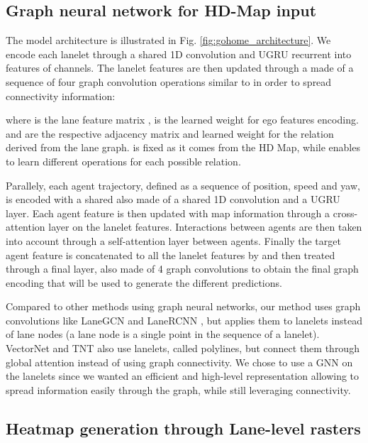 \documentclass[letterpaper, 10 pt, conference]{ieeeconf}
\begin{document}
\subsection{Graph neural network for HD-Map input}

The model architecture is illustrated in Fig. \ref{fig:gohome_architecture}. We encode each lanelet through a shared 1D convolution and UGRU \cite{ugru, rozenberg2021asymmetrical} recurrent  into features  of  channels. The lanelet features  are then updated through a  made of a sequence of four graph convolution operations similar to \cite{liang2020learning} in order to spread connectivity information:

where  is the  lane feature matrix ,  is the learned  weight for ego features encoding.  and  are the respective adjacency matrix  and learned weight  for the relation  derived from the lane graph.  is fixed as it comes from the HD Map, while   enables to learn different operations for each possible relation. 



Parallely, each agent trajectory, defined as a sequence of position, speed and yaw, is encoded with a shared  also made of a shared 1D convolution and a UGRU layer. Each agent feature is then updated with map information through a cross-attention  layer on the lanelet features. Interactions between agents are then taken into account through a self-attention  layer between agents.  
Finally the target agent feature is concatenated to all the lanelet features by  and then treated through a final  layer, also made of 4 graph convolutions to obtain the final graph encoding that will be used to generate the different predictions.



Compared to other methods using graph neural networks, our method uses graph convolutions like LaneGCN \cite{liang2020learning} and LaneRCNN \cite{zeng2021lanercnn}, but applies them to lanelets instead of lane nodes (a lane node is a single point in the sequence of a lanelet). VectorNet \cite{gao2020vectornet} and TNT \cite{zhao2020tnt} also use lanelets, called polylines, but connect them through global attention instead of using graph connectivity. We chose to use a GNN on the lanelets since we wanted an efficient and high-level representation allowing to spread information easily through the graph, while still leveraging connectivity. 




\subsection{Heatmap generation through Lane-level rasters}
\end{document}

